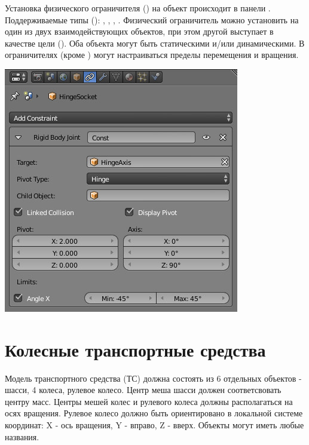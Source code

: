 \documentclass[a4paper,12pt,oneside]{sphinxmanual}
\begin{document}
\begin{DUlineblock}{0em}
\item[] 
\end{DUlineblock}

Установка физического ограничителя () на объект происходит в панели . Поддерживаемые типы (): , , , . Физический ограничитель можно установить на один из двух взаимодействующих объектов, при этом другой выступает в качестве цели (). Оба объекта могут быть статическими и/или динамическими. В ограничителях (кроме ) могут настраиваться пределы перемещения и вращения.

\includegraphics[width=1.000\linewidth]{physics_constraints_panel.jpg}

\begin{DUlineblock}{0em}
\item[] 
\end{DUlineblock}


\section{Колесные транспортные средства}
\label{physics:id5}
Модель транспортного средства (ТС) должна состоять из 6 отдельных объектов - шасси, 4 колеса, рулевое колесо. Центр меша шасси должен соответсвовать центру масс. Центры мешей колес и рулевого колеса должны располагаться на осях вращения. Рулевое колесо должно быть ориентировано в локальной системе координат: X - ось вращения, Y - вправо, Z - вверх. Объекты могут иметь любые названия.
\end{document}
